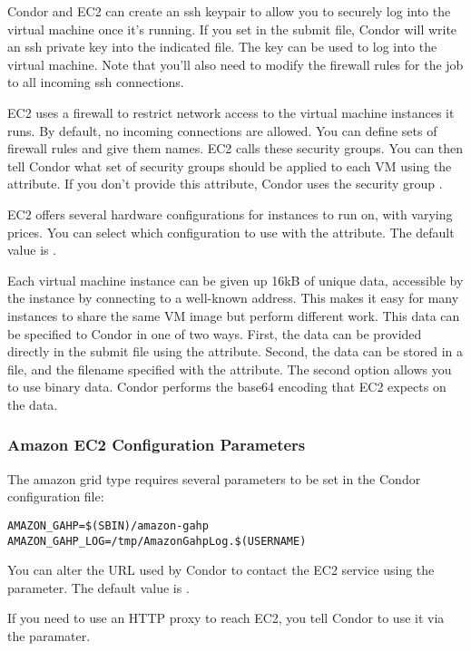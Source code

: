Condor and EC2 can create an ssh keypair to allow you to securely log
into the virtual machine once it's running. If you set
 in the submit file, Condor will write
an ssh private key into the indicated file. The key can be used to log
into the virtual machine. Note that you'll also need to modify the firewall
rules for the job to all incoming ssh connections.

EC2 uses a firewall to restrict network access to the virtual machine
instances it runs. By default, no incoming connections are allowed.
You can define sets of firewall rules and give them names. EC2 calls
these security groups. You can then tell Condor what set of security
groups should be applied to each VM using the
 attribute. If you don't provide
this attribute, Condor uses the security group .

EC2 offers several hardware configurations for instances to run on, with
varying prices. You can select which configuration to use with the
 attribute. The default value is
.

Each virtual machine instance can be given up 16kB of unique data, 
accessible by the instance by connecting to a well-known address. This
makes it easy for many instances to share the same VM image but perform
different work. This data can be specified to Condor in one of two ways.
First, the data can be provided directly in the submit file using the
 attribute. Second, the data can be
stored in a file, and the filename specified with the
 attribute. The second option allows
you to use binary data. Condor performs the base64 encoding that EC2
expects on the data.

\subsubsection{\label{sec:Amazon-config}Amazon EC2 Configuration Parameters}

The amazon grid type requires several parameters to be set in the Condor
configuration file:

\footnotesize
\begin{verbatim}
AMAZON_GAHP=$(SBIN)/amazon-gahp
AMAZON_GAHP_LOG=/tmp/AmazonGahpLog.$(USERNAME)
\end{verbatim}
\normalsize

You can alter the URL used by Condor to contact the EC2 service using
the  parameter. The default value is
.

If you need to use an HTTP proxy to reach EC2, you tell Condor to use it
via the  paramater.
